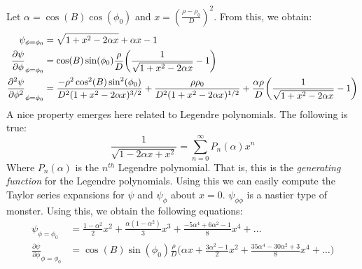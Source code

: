 \documentclass[crop=false,class=book,oneside]{standalone}
\begin{document}
            Let $\alpha=\cos(B)\cos(\phi_{0})$ and
            $x=(\frac{\rho-\rho_{0}}{D})^{2}$.
            From this, we obtain:
            \begin{align*}
                \psi_{\phi=\phi_{0}}
                &=\sqrt{1+x^{2}-2\alpha{x}}+\alpha{x}-1\\
                \frac{\partial\psi}
                     {\partial\phi}_{\phi=\phi_{0}}
                &=\cos(B)\sin(\phi_{0})\frac{\rho}{D}
                \bigg(
                    \frac{1}{\sqrt{1+x^{2}-2\alpha{x}}}-1
                \bigg)\\
                \frac{\partial^{2}\psi}
                     {\partial\phi^{2}}_{\phi=\phi_{0}}
                &=\frac{%
                      -\rho^{2}\cos^{2}(B)\sin^{2}(\phi_{0})
                  }{%
                    D^{2}(1+x^{2}-2\alpha{x})^{3/2}
                  }
                  +\frac{\rho\rho_{0}}
                        {D^{2}(1+x^{2}-2\alpha{x})^{1/2}}
                  +\frac{\alpha\rho}{D}
                  \bigg(\frac{1}{\sqrt{1+x^{2}-2\alpha{x}}}-1\bigg)
            \end{align*}
            A nice property emerges here related to
            Legendre polynomials. The following is true:
            \begin{equation*}
                \frac{1}{\sqrt{1-2\alpha{x}+x^{2}}}
                =\sum_{n=0}^{\infty}P_{n}(\alpha)x^{n}
            \end{equation*}
            Where $P_{n}(\alpha)$ is the $n^{th}$
            Legendre polynomial. That is, this is
            the \textit{generating function} for the
            Legendre polynomials. Using this we can
            easily compute the Taylor series expansions
            for $\psi$ and $\psi_{\phi}$ about $x=0$.
            $\psi_{\phi\phi}$ is a nastier type of monster.
            Using this, we obtain the following equations:
            \begin{align*}
                \psi_{\phi=\phi_{0}}
                &=\frac{1-\alpha^{2}}{2}x^{2}
                 +\frac{\alpha(1-\alpha^{2})}{3}x^{3}
                 +\frac{-5\alpha^{4}+6\alpha^{2}-1}{8}x^{4}+
                 \hdots\\
                  \frac{\partial\psi}
                       {\partial\phi}_{\phi=\phi_{0}}
                &=\cos(B)\sin(\phi_{0})\frac{\rho}{D}
                  \bigg(
                      \alpha{x}+\frac{3\alpha^{2}-1}{2}x^{2}
                      +\frac{35\alpha^{4}-30\alpha^{2}+3}{8}x^{4}
                      +\hdots
                  \bigg)
            \end{align*}
\end{document}
